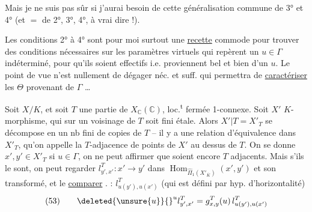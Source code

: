 Mais je ne suis pas sûr si j'aurai besoin de cette généralisation commune de 3° et 4° (et $=$ de 2°, 3°, 4°, à vrai dire !).

Les conditions 2° à 4° sont pour moi surtout une \uline{recette} commode pour trouver des conditions nécessaires sur les paramètres virtuels qui repèrent un $u\in\Gamma$ indéterminé, pour qu'ils soient effectifs i.e. proviennent bel et bien d'un $u$. Le point de vue  n'est nullement de dégager   néc. et suff. qui permettra de \uline{caractériser} les $\Theta$ provenant de $\Gamma$ \ldots
{}

\hrulefill

Soit $X/K$, et soit $T$ une partie de
$X_{\mathbb C}(\mathbb C)$, loc.\textsuperscript{t} fermée 1-connexe. Soit $X'$  $K$-morphisme, qui sur  un voisinage de $T$ soit fini étale. Alors $X'\vert T=X'_T$ se décompose en un nb fini de copies de $T$ -- il y a une relation d'équivalence dans $X'_T$, qu'on appelle la $T$-adjacence de points de $X'$ au dessus de $T$. On se donne  $x',y'\in X'_T$
si $u\in\Gamma$, on ne peut affirmer que  soient encore $T$ adjacents.
Mais s'ils le sont, on peut regarder $l^T_{y',x'}:x'\to y'$  dans  $\operatorname{Hom}_{\widehat{\Pi}_1(X'_{\overline K})}(x',y')$ et son transformé,   et le \uline{comparer} . : $l^T_{u(y'),u(x')}$ (qui est défini par hyp. d'horizontalité)
\[
(53)\qquad \deleted{\unsure{u}}{}^u l^T_{y',x'}=g^T_{x,y}(u)\,l^T_{u(y'),u(x')}
\]
